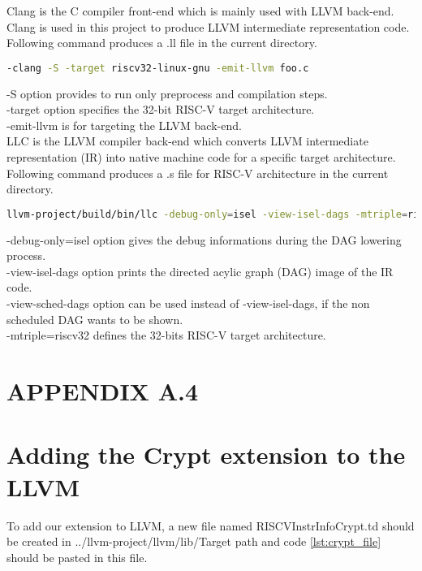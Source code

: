 Clang is the C compiler front-end which is mainly used with LLVM back-end. Clang is used in this project to produce LLVM intermediate representation code. Following command produces a .ll file in the current directory. 

\begin{lstlisting}[language=Bash]
-clang -S -target riscv32-linux-gnu -emit-llvm foo.c
\end{lstlisting}

-S option provides to run only preprocess and compilation steps. \\
-target option specifies the 32-bit RISC-V target architecture. \\
-emit-llvm is for targeting the LLVM back-end. \\

LLC is the LLVM compiler back-end which converts LLVM intermediate representation (IR) into native machine code for a specific target architecture. Following command produces a .s file for RISC-V architecture in the current directory. 

\begin{lstlisting}[language=Bash]
llvm-project/build/bin/llc -debug-only=isel -view-isel-dags -mtriple=riscv32 lxr.ll
\end{lstlisting}

-debug-only=isel option gives the debug informations during the DAG lowering process.\\
-view-isel-dags option prints the directed acylic graph (DAG) image of the IR code.\\
-view-sched-dags option can be used instead of -view-isel-dags, if the non scheduled DAG wants to be shown.\\
-mtriple=riscv32 defines the 32-bits RISC-V target architecture.\\
\newpage



\section*{APPENDIX A.4}
\renewcommand{\theequation}{A.2.\arabic{equation}}
\setcounter{equation}{0}
\section{Adding the Crypt extension to the LLVM}
To add our extension to LLVM, a new file named RISCVInstrInfoCrypt.td should be created in ../llvm-project/llvm/lib/Target path and code \ref{lst:crypt_file} should be pasted in this file.

